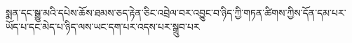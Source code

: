སྨན་དང་སྒྱུ་མའི་དཔེས་ཆོས་ཐམས་ཅད་རྟེན་ཅིང་འབྲེལ་བར་འབྱུང་བ་ཉིད་ཀྱི་གཏན་ཚིགས་ཀྱིས་དོན་དམ་པར་ཡོད་པ་དང་མེད་པ་ཉིད་ལས་ཡང་དག་པར་འདས་པར་སྒྲུབ་པར